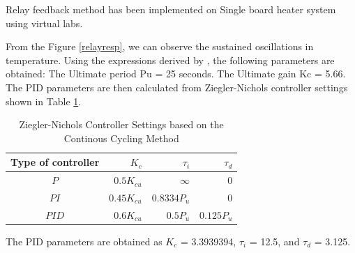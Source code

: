 Relay feedback method has been implemented on Single board heater system using virtual labs.


From the Figure \ref{relayresp}, we can observe the sustained
oscillations in temperature. 
Using the expressions derived by \cite{karl84}, the following
parameters are obtained:
The Ultimate period Pu = 25 seconds.
The Ultimate gain Kc = 5.66.  The                    
PID parameters are then calculated from Ziegler-Nichols controller
settings shown in Table \ref{2ndmtd}. 
\begin{table}
\begin{center}
\renewcommand{\arraystretch}{1.5}
\begin{tabular}{|c|r|r|r|}\hline
Type of
controller & $K_{c}$ & $\tau_i$ & $\tau_d$ \\ \hline
$P$ & $0.5K_{cu}$ & $\infty$ & 0 \\ \hline
$PI$ & $0.45K_{cu}$ & $ 0.8334P_{u}$ & 0 \\\hline
$PID$ & $0.6K_{cu}$ & $0.5P_{u}$ & $0.125P_{u}$ \\ \hline
\end{tabular}
\caption{Ziegler-Nichols Controller Settings based on the Continous Cycling Method}
\label{2ndmtd}
\end{center}
\end{table}%
The PID parameters are obtained as
$K_{c}$ = 3.3939394,
$\tau_i$ = 12.5, and 
$\tau_d$ = 3.125.


           
